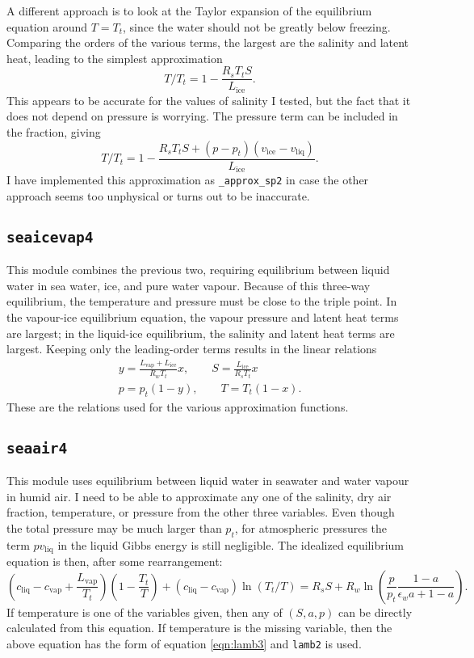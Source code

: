\documentclass{article}
\newcommand{\liq}{\text{liq}}
\newcommand{\vap}{\text{vap}}
\newcommand{\ice}{\text{ice}}
\newcommand{\epsw}{\epsilon_w}
\begin{document}
A different approach is to look at the Taylor expansion of the equilibrium equation around $T = T_t$, since the water should not be greatly below freezing. Comparing the orders of the various terms, the largest are the salinity and latent heat, leading to the simplest approximation
\begin{equation*}
    T/T_t = 1 - \frac{R_s T_t S}{L_{\ice}}.
\end{equation*}
This appears to be accurate for the values of salinity I tested, but the fact that it does not depend on pressure is worrying. The pressure term can be included in the fraction, giving
\begin{equation*}
    T/T_t = 1 - \frac{R_s T_t S + (p - p_t) (v_{\ice} - v_{\liq})}{L_{\ice}}.
\end{equation*}
I have implemented this approximation as \texttt{\_approx\_sp2} in case the other approach seems too unphysical or turns out to be inaccurate.


\subsection{\texttt{seaicevap4}}

This module combines the previous two, requiring equilibrium between liquid water in sea water, ice, and pure water vapour. Because of this three-way equilibrium, the temperature and pressure must be close to the triple point. In the vapour-ice equilibrium equation, the vapour pressure and latent heat terms are largest; in the liquid-ice equilibrium, the salinity and latent heat terms are largest. Keeping only the leading-order terms results in the linear relations
\begin{gather*}
    y = \frac{L_{\vap} + L_{\ice}}{R_w T_t} x, \qquad S = \frac{L_{\ice}}{R_s T_t} x \\
    p = p_t (1-y), \qquad T = T_t (1-x).
\end{gather*}
These are the relations used for the various approximation functions.


\subsection{\texttt{seaair4}}

This module uses equilibrium between liquid water in seawater and water vapour in humid air. I need to be able to approximate any one of the salinity, dry air fraction, temperature, or pressure from the other three variables. Even though the total pressure may be much larger than $p_t$, for atmospheric pressures the term $p v_{\liq}$ in the liquid Gibbs energy is still negligible. The idealized equilibrium equation is then, after some rearrangement:
\begin{equation*}
    \left( c_{\liq} - c_{\vap} + \frac{L_{\vap}}{T_t} \right) \left( 1 - \frac{T_t}{T} \right) + (c_{\liq} - c_{\vap}) \ln(T_t/T) = R_s S + R_w \ln\left( \frac{p}{p_t} \frac{1-a}{\epsw a + 1-a} \right).
\end{equation*}
If temperature is one of the variables given, then any of $(S,a,p)$ can be directly calculated from this equation. If temperature is the missing variable, then the above equation has the form of equation \ref{eqn:lamb3} and \texttt{lamb2} is used.
\end{document}
